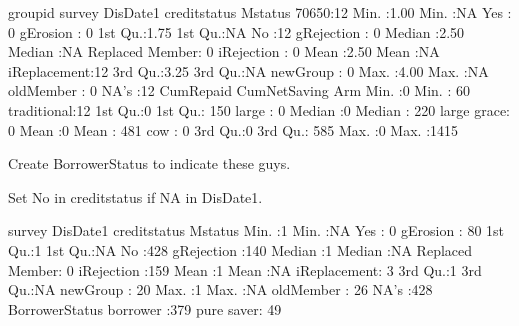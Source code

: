 \begin{Schunk}
\begin{Soutput}
  groupid       survey        DisDate1           creditstatus         Mstatus  
 70650:12   Min.   :1.00   Min.   :NA   Yes            : 0    gErosion    : 0  
            1st Qu.:1.75   1st Qu.:NA   No             :12    gRejection  : 0  
            Median :2.50   Median :NA   Replaced Member: 0    iRejection  : 0  
            Mean   :2.50   Mean   :NA                         iReplacement:12  
            3rd Qu.:3.25   3rd Qu.:NA                         newGroup    : 0  
            Max.   :4.00   Max.   :NA                         oldMember   : 0  
                           NA's   :12                                          
   CumRepaid  CumNetSaving           Arm    
 Min.   :0   Min.   :  60   traditional:12  
 1st Qu.:0   1st Qu.: 150   large      : 0  
 Median :0   Median : 220   large grace: 0  
 Mean   :0   Mean   : 481   cow        : 0  
 3rd Qu.:0   3rd Qu.: 585                   
 Max.   :0   Max.   :1415                   
                                            
\end{Soutput}
\end{Schunk}
Create \textsf{BorrowerStatus} to indicate these guys. \gobblepars

Set \textsf{No} in \textsf{creditstatus} if NA in \textsf{DisDate1}.
\begin{Schunk}
\begin{Soutput}
     survey     DisDate1            creditstatus         Mstatus   
 Min.   :1   Min.   :NA    Yes            :  0   gErosion    : 80  
 1st Qu.:1   1st Qu.:NA    No             :428   gRejection  :140  
 Median :1   Median :NA    Replaced Member:  0   iRejection  :159  
 Mean   :1   Mean   :NA                          iReplacement:  3  
 3rd Qu.:1   3rd Qu.:NA                          newGroup    : 20  
 Max.   :1   Max.   :NA                          oldMember   : 26  
             NA's   :428                                           
    BorrowerStatus
 borrower  :379   
 pure saver: 49   
                  
                  
                  
                  
                  
\end{Soutput}
\end{Schunk}

